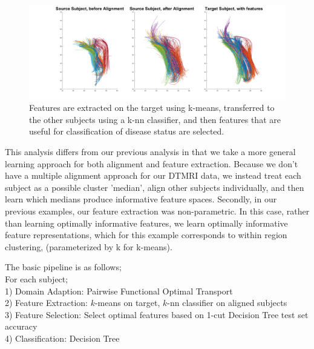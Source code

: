 \documentclass[]{article}
\begin{document}
\begin{figure}
	\includegraphics[width = \linewidth]{./DTMRI_features_10_new}
	\caption{Features are extracted on the target using k-means, transferred to the other subjects using a k-nn classifier, and then features that are useful for classification of disease status are selected.}
	\label{aligned function}
\end{figure}



This analysis differs from our previous analysis in that we take a more general learning approach for both alignment and feature extraction. Because we don't have a multiple alignment approach for our DTMRI data, we instead treat each subject as a possible cluster 'median', align other subjects individually, and then learn which medians produce informative feature spaces. Secondly, in our previous examples, our feature extraction was non-parametric. In this case, rather than learning optimally informative features, we learn optimally informative feature representations, which for this example corresponds to within region clustering, (parameterized by k for k-means).



The basic pipeline is as follows;\\

\noindent
For each subject;\\
1) Domain Adaption: Pairwise Functional Optimal Transport\\
2) Feature Extraction: $k$-means on target, $k$-nn classifier on aligned subjects\\
3) Feature Selection: Select optimal features based on 1-cut Decision Tree test set accuracy\\
4) Classification: Decision Tree\\
\end{document}
